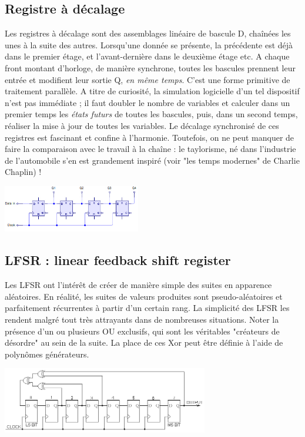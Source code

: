 \subsection{Registre à décalage}
Les registres à décalage sont des assemblages linéaire de bascule D, chaînées les unes à la suite des autres. Lorsqu'une donnée se présente, la précédente est déjà
dans le premier étage, et l'avant-dernière dans le deuxième étage etc. A chaque front montant d'horloge, de manière synchrone, toutes les bascules prennent leur entrée et modifient
leur sortie Q, {\it en même temps}. C'est une forme primitive de traitement parallèle. A titre de curiosité, la simulation logicielle d'un tel dispositif n'est pas immédiate ; il faut doubler
le nombre de variables et calculer dans un premier temps les {\it états futurs} de toutes les bascules, puis, dans un second temps,  réaliser la mise à jour de toutes les variables.
Le décalage synchronisé de ces registres est fascinant et confine à l'harmonie. Toutefois, on ne peut manquer de faire la comparaison avec le travail à la chaîne : le taylorisme, né
dans l'industrie de l'automobile s'en est grandement inspiré (voir "les temps modernes" de Charlie Chaplin) !


\begin{center}
  \includegraphics[width=6cm]{./figures/Shift_Register.png}
\end{center}

\subsection{LFSR : linear feedback shift register}
Les LFSR ont l'intérêt de créer de manière simple des suites en apparence aléatoires. En réalité, les suites
de valeurs produites sont pseudo-aléatoires et parfaitement récurrentes à partir d'un certain rang. La simplicité
des LFSR les rendent malgré tout très attrayants dans de nombreuses situations. Noter la présence d'un ou plusieurs OU exclusifs, qui
sont les véritables "créateurs de désordre" au sein de la suite. La place de ces Xor peut être définie à l'aide de polynômes générateurs.
\begin{center}
  \includegraphics[width=9cm]{./figures/lfsr.png}
\end{center}

